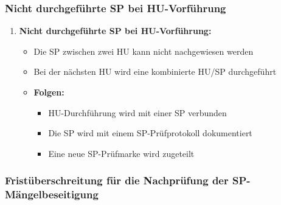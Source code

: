 \documentclass{vorlage-design-main}
\begin{document}
\subsubsection{Nicht durchgeführte SP bei
HU-Vorführung}\label{nicht-durchgefuehrte-sp-bei-hu-vorfuehrung}

\begin{enumerate}
\def\labelenumi{\arabic{enumi}.}

\item
  \textbf{Nicht durchgeführte SP bei HU-Vorführung:}

  \begin{itemize}
  
  \item
    Die SP zwischen zwei HU kann nicht nachgewiesen werden
  \item
    Bei der nächsten HU wird eine kombinierte HU/SP durchgeführt
  \item
    \textbf{Folgen:}

    \begin{itemize}
    
    \item
      HU-Durchführung wird mit einer SP verbunden
    \item
      Die SP wird mit einem SP-Prüfprotokoll dokumentiert
    \item
      Eine neue SP-Prüfmarke wird zugeteilt
    \end{itemize}
  \end{itemize}
\end{enumerate}

\subsubsection{Fristüberschreitung für die Nachprüfung der
SP-Mängelbeseitigung}\label{fristueberschreitung-fuer-die-nachpruefung-der-sp-maengelbeseitigung}
\end{document}
